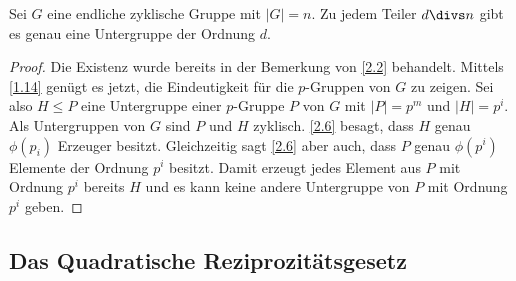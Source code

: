\begin{nt*}
	Sei $G$ eine endliche zyklische Gruppe mit $|G| = n$.
	Zu jedem Teiler $d \divs n$ gibt es genau eine Untergruppe der Ordnung $d$.
	\begin{proof}
		Die Existenz wurde bereits in der Bemerkung von \ref{2.2} behandelt.
		Mittels \ref{1.14} genügt es jetzt, die Eindeutigkeit für die $p$-Gruppen von $G$ zu zeigen.
		Sei also $H \le P$ eine Untergruppe einer $p$-Gruppe $P$ von $G$ mit $|P| = p^m$ und $|H| = p^i$.
		Als Untergruppen von $G$ sind $P$ und $H$ zyklisch.
		\ref{2.6} besagt, dass $H$ genau $\phi(p_i)$ Erzeuger besitzt.
		Gleichzeitig sagt \ref{2.6} aber auch, dass $P$ genau $\phi(p^i)$ Elemente der Ordnung $p^i$ besitzt.
		Damit erzeugt jedes Element aus $P$ mit Ordnung $p^i$ bereits $H$ und es kann keine andere Untergruppe von $P$ mit Ordnung $p^i$ geben.
	\end{proof}
\end{nt*}

\subsection{Das Quadratische Reziprozitätsgesetz}

